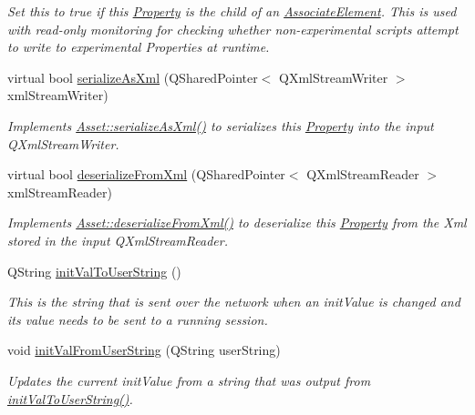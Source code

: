 \begin{DoxyCompactItemize}
\begin{DoxyCompactList}\small\item\em Set this to true if this \hyperlink{class_picto_1_1_property}{Property} is the child of an \hyperlink{class_picto_1_1_associate_element}{Associate\-Element}. This is used with read-\/only monitoring for checking whether non-\/experimental scripts attempt to write to experimental Properties at runtime. \end{DoxyCompactList}\item 
virtual bool \hyperlink{class_picto_1_1_property_ab13f7e111f9d874a8ff00d574d5fa76c}{serialize\-As\-Xml} (Q\-Shared\-Pointer$<$ Q\-Xml\-Stream\-Writer $>$ xml\-Stream\-Writer)
\begin{DoxyCompactList}\small\item\em Implements \hyperlink{class_picto_1_1_asset_a3ecc27a886c700438d98187e030d203f}{Asset\-::serialize\-As\-Xml()} to serializes this \hyperlink{class_picto_1_1_property}{Property} into the input Q\-Xml\-Stream\-Writer. \end{DoxyCompactList}\item 
virtual bool \hyperlink{class_picto_1_1_property_a8db200ce04af32ce77a77ea5dd8fba7c}{deserialize\-From\-Xml} (Q\-Shared\-Pointer$<$ Q\-Xml\-Stream\-Reader $>$ xml\-Stream\-Reader)
\begin{DoxyCompactList}\small\item\em Implements \hyperlink{class_picto_1_1_asset_a45e33e9da0d81734ec9e50a02ac325be}{Asset\-::deserialize\-From\-Xml()} to deserialize this \hyperlink{class_picto_1_1_property}{Property} from the Xml stored in the input Q\-Xml\-Stream\-Reader. \end{DoxyCompactList}\item 
Q\-String \hyperlink{class_picto_1_1_property_a598e6607b9970fcda2b99a60e455c1e3}{init\-Val\-To\-User\-String} ()
\begin{DoxyCompactList}\small\item\em This is the string that is sent over the network when an init\-Value is changed and its value needs to be sent to a running session. \end{DoxyCompactList}\item 
void \hyperlink{class_picto_1_1_property_ad05cda1e03dbf67d6b44259956120777}{init\-Val\-From\-User\-String} (Q\-String user\-String)
\begin{DoxyCompactList}\small\item\em Updates the current init\-Value from a string that was output from \hyperlink{class_picto_1_1_property_a598e6607b9970fcda2b99a60e455c1e3}{init\-Val\-To\-User\-String()}. \end{DoxyCompactList}\item 

\end{DoxyCompactItemize}
